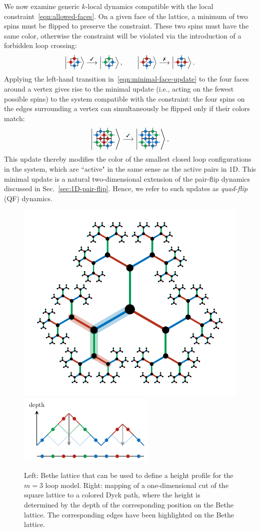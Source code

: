 We now examine generic $k$-local dynamics compatible with the local constraint~\eqref{eqn:allowed-faces}.
On a given face of the lattice, a minimum of two spins must be flipped to preserve the constraint. These two spins must have the same color, otherwise the constraint will be violated via the introduction of a forbidden loop crossing:
%
%
\begin{equation}
    \RBsite \stackrel{\cmark}{\longrightarrow} \GBsite
    \, ,
    \qquad 
    \RBsite \stackrel{\xmark}{\longrightarrow} \RBRBsite
    \, .
    \label{eqn:minimal-face-update}
\end{equation}
%
%
Applying the left-hand transition in~\eqref{eqn:minimal-face-update} to the four faces around a vertex gives rise to the minimal update (i.e., acting on the fewest possible spins) to the system compatible with the constraint: the four spins on the edges surrounding a vertex can simultaneously be flipped only if their colors match:
%
%
\begin{equation}
    \RQuad \stackrel{\cmark}{\longrightarrow} \BQuadAlt
    \, ,
    \label{eqn:minimal-vertex-update}
\end{equation}
%
%
This update thereby modifies the color of the smallest closed loop configurations in the system, which are ``active" in the same sense as the active pairs in 1D. This minimal update is a natural two-dimensional extension of the pair-flip dynamics discussed in Sec.~\ref{sec:1D-pair-flip}. Hence, we refer to such updates as \emph{quad-flip} (QF) dynamics. 

\begin{figure}[t]
    \centering
    \includegraphics[width=0.28\linewidth,valign=c]{img/m=3_bethe.pdf}%
    \hspace{1cm}%
    \includegraphics[width=0.36\linewidth,valign=c]{img/dyck_path.pdf}%
    \caption[Bethe lattice and height model]{Left: Bethe lattice that can be used to define a height profile for the $m=3$ loop model. Right: mapping of a one-dimensional cut of the square lattice to a colored Dyck path, where the height is determined by the depth of the corresponding position on the Bethe lattice. The corresponding edges have been highlighted on the Bethe lattice.}
    \label{fig:Bethe}
\end{figure}

